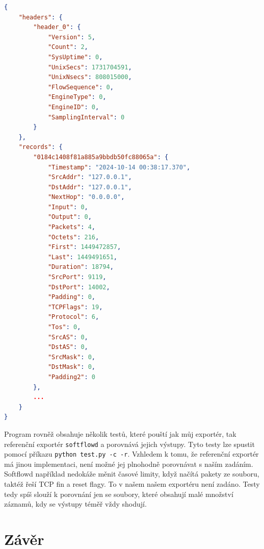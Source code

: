 \documentclass[a4paper, 11pt]{article}
\begin{document}
\begin{sloppypar}
\begin{lstlisting}[language=json, caption={Ukázka logu z kolektoru}, label={lst1}]
{
    "headers": {
        "header_0": {
            "Version": 5,
            "Count": 2,
            "SysUptime": 0,
            "UnixSecs": 1731704591,
            "UnixNsecs": 808015000,
            "FlowSequence": 0,
            "EngineType": 0,
            "EngineID": 0,
            "SamplingInterval": 0
        }
    },
    "records": {
        "0184c1408f81a885a9bbdb50fc88065a": {
            "Timestamp": "2024-10-14 00:38:17.370",
            "SrcAddr": "127.0.0.1",
            "DstAddr": "127.0.0.1",
            "NextHop": "0.0.0.0",
            "Input": 0,
            "Output": 0,
            "Packets": 4,
            "Octets": 216,
            "First": 1449472857,
            "Last": 1449491651,
            "Duration": 18794,
            "SrcPort": 9119,
            "DstPort": 14002,
            "Padding": 0,
            "TCPFlags": 19,
            "Protocol": 6,
            "Tos": 0,
            "SrcAS": 0,
            "DstAS": 0,
            "SrcMask": 0,
            "DstMask": 0,
            "Padding2": 0
        },
        ...
    }
}

\end{lstlisting}


Program rovněž obsahuje několik testů, které pouští jak můj exportér, tak referenční exportér \texttt{softflowd} a porovnává jejich výstupy. Tyto testy lze spustit pomocí příkazu \texttt{python test.py -c -r}. Vzhledem k tomu, že referenční exportér má jinou implementaci, není možné jej plnohodně porovnávat s naším zadáním. Softflowd například nedokáže měnit časové limity, když načítá pakety ze souboru, taktéž řeší TCP fin a reset flagy. To v našem našem exportéru není zadáno. Testy tedy spíš slouží k porovnání jen se soubory, které obsahují malé množství záznamů, kdy se výstupy téměř vždy shodují.
\section{Závěr}



\end{sloppypar}
\end{document}

